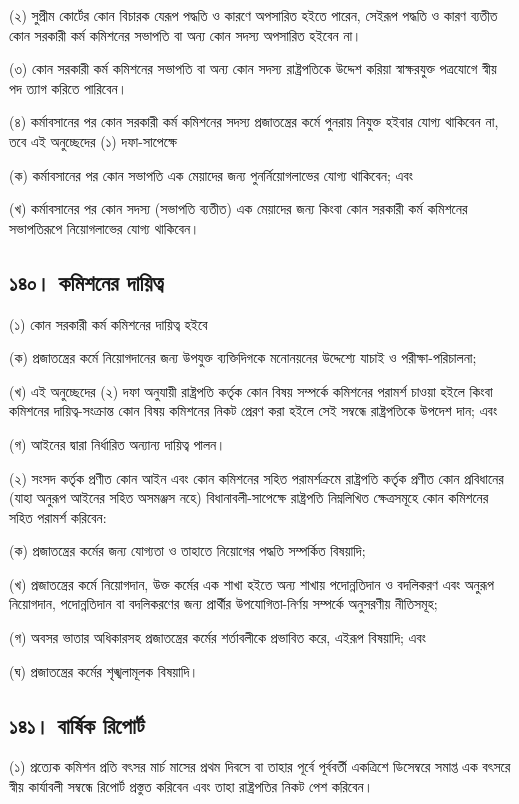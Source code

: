 \documentclass[11pt]{article}
\begin{document}
(২) সুপ্রীম কোর্টের কোন বিচারক যেরূপ পদ্ধতি ও কারণে অপসারিত হইতে পারেন,
    সেইরূপ পদ্ধতি ও কারণ ব্যতীত কোন সরকারী কর্ম কমিশনের সভাপতি বা অন্য কোন সদস্য
    অপসারিত হইবেন না।

(৩) কোন সরকারী কর্ম কমিশনের সভাপতি বা অন্য কোন সদস্য রাষ্ট্রপতিকে উদ্দেশ
    করিয়া স্বাক্ষরযুক্ত পত্রযোগে স্বীয় পদ ত্যাগ করিতে পারিবেন।

(৪) কর্মাবসানের পর কোন সরকারী কর্ম কমিশনের সদস্য প্রজাতন্ত্রের কর্মে পুনরায়
    নিযুক্ত হইবার যোগ্য থাকিবেন না, তবে এই অনুচ্ছেদের (১) দফা-সাপেক্ষে

(ক) কর্মাবসানের পর কোন সভাপতি এক মেয়াদের জন্য পুনর্নিয়োগলাভের যোগ্য
    থাকিবেন; এবং

(খ) কর্মাবসানের পর কোন সদস্য (সভাপতি ব্যতীত) এক মেয়াদের জন্য কিংবা কোন
    সরকারী কর্ম কমিশনের সভাপতিরূপে নিয়োগলাভের যোগ্য থাকিবেন।

\subsection{১৪০। কমিশনের দায়িত্ব}
\label{sec:orgc5ef44a}
(১) কোন সরকারী কর্ম কমিশনের দায়িত্ব হইবে

(ক) প্রজাতন্ত্রের  কর্মে নিয়োগদানের জন্য উপযুক্ত  ব্যক্তিদিগকে মনোনয়নের উদ্দেশ্যে
    যাচাই ও পরীক্ষা-পরিচালনা;

(খ) এই অনুচ্ছেদের  (২) দফা অনুযায়ী রাষ্ট্রপতি কর্তৃক কোন  বিষয় সম্পর্কে কমিশনের
    পরামর্শ চাওয়া হইলে  কিংবা কমিশনের দায়িত্ব-সংক্রান্ত কোন  বিষয় কমিশনের নিকট
    প্রেরণ করা হইলে সেই সম্বন্ধে রাষ্ট্রপতিকে উপদেশ দান; এবং

(গ) আইনের দ্বারা নির্ধারিত অন্যান্য দায়িত্ব পালন।

(২) সংসদ কর্তৃক  প্রণীত কোন আইন এবং কোন কমিশনের  সহিত পরামর্শক্রমে রাষ্ট্রপতি
    কর্তৃক  প্রণীত   কোন  প্রবিধানের  (যাহা   অনুরূপ  আইনের  সহিত   অসমঞ্জস  নহে)
    বিধানাবলী-সাপেক্ষে রাষ্ট্রপতি নিম্নলিখিত ক্ষেত্রসমূহে কোন কমিশনের সহিত পরামর্শ
    করিবেন:

(ক)  প্রজাতন্ত্রের  কর্মের  জন্য  যোগ্যতা ও  তাহাতে  নিয়োগের  পদ্ধতি  সম্পর্কিত
    বিষয়াদি;

(খ)  প্রজাতন্ত্রের  কর্মে নিয়োগদান,  উক্ত  কর্মের  এক  শাখা হইতে  অন্য  শাখায়
    পদোন্নতিদান ও  বদলিকরণ এবং অনুরূপ  নিয়োগদান, পদোন্নতিদান বা  বদলিকরণের জন্য
    প্রার্থীর উপযোগিতা-নির্ণয় সম্পর্কে অনুসরণীয় নীতিসমূহ;

(গ) অবসর ভাতার  অধিকারসহ প্রজাতন্ত্রের কর্মের শর্তাবলীকে  প্রভাবিত করে, এইরূপ
    বিষয়াদি; এবং

(ঘ) প্রজাতন্ত্রের কর্মের শৃঙ্খলামূলক বিষয়াদি।

\subsection{১৪১। বার্ষিক রিপোর্ট}
\label{sec:orgd4ec1ae}
(১) প্রত্যেক কমিশন প্রতি বৎসর মার্চ মাসের প্রথম দিবসে বা তাহার পূর্বে পূর্ববর্তী
    একত্রিশে ডিসেম্বরে সমাপ্ত এক বৎসরে স্বীয় কার্যাবলী সম্বন্ধে রিপোর্ট প্রস্তুত
    করিবেন এবং তাহা রাষ্ট্রপতির নিকট পেশ করিবেন।
\end{document}
